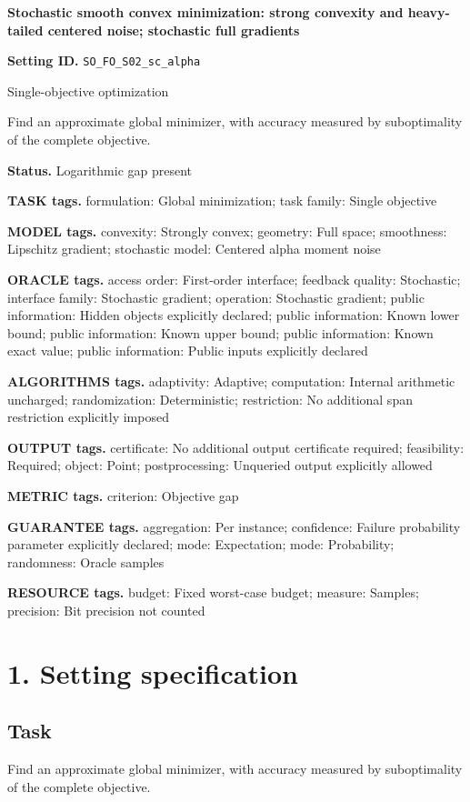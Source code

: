 \documentclass[10pt,a4paper]{article}
\begin{document}
\raggedright

{\LARGE\bfseries\sffamily\color{AtlasNavy} Stochastic smooth convex minimization: strong convexity and heavy-tailed centered noise; stochastic full gradients\par}\vspace{5pt}
\textbf{Setting ID.} \texttt{SO\_\allowbreak{}FO\_\allowbreak{}S02\_\allowbreak{}sc\_\allowbreak{}alpha}

Single-objective optimization

Find an approximate global minimizer, with accuracy measured by suboptimality of the complete objective.

\textbf{Status.} Logarithmic gap present

\textbf{TASK tags.} formulation: Global minimization; task family: Single objective

\textbf{MODEL tags.} convexity: Strongly convex; geometry: Full space; smoothness: Lipschitz gradient; stochastic model: Centered alpha moment noise

\textbf{ORACLE tags.} access order: First-order interface; feedback quality: Stochastic; interface family: Stochastic gradient; operation: Stochastic gradient; public information: Hidden objects explicitly declared; public information: Known lower bound; public information: Known upper bound; public information: Known exact value; public information: Public inputs explicitly declared

\textbf{ALGORITHMS tags.} adaptivity: Adaptive; computation: Internal arithmetic uncharged; randomization: Deterministic; restriction: No additional span restriction explicitly imposed

\textbf{OUTPUT tags.} certificate: No additional output certificate required; feasibility: Required; object: Point; postprocessing: Unqueried output explicitly allowed

\textbf{METRIC tags.} criterion: Objective gap

\textbf{GUARANTEE tags.} aggregation: Per instance; confidence: Failure probability parameter explicitly declared; mode: Expectation; mode: Probability; randomness: Oracle samples

\textbf{RESOURCE tags.} budget: Fixed worst-case budget; measure: Samples; precision: Bit precision not counted

\section{1. Setting specification}
\subsection{Task}
Find an approximate global minimizer, with accuracy measured by suboptimality of the complete objective.
\end{document}

